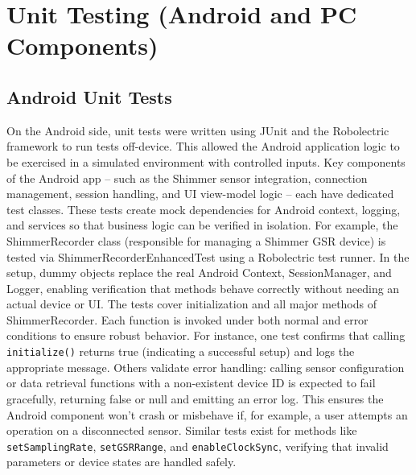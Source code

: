 \section{Unit Testing (Android and PC Components)}

\subsection{Android Unit Tests}

On the Android side, unit tests were written using JUnit and the Robolectric framework to run tests off-device. This allowed the Android application logic to be exercised in a simulated environment with controlled inputs. Key components of the Android app – such as the Shimmer sensor integration, connection management, session handling, and UI view-model logic – each have dedicated test classes. These tests create mock dependencies for Android context, logging, and services so that business logic can be verified in isolation. For example, the ShimmerRecorder class (responsible for managing a Shimmer GSR device) is tested via ShimmerRecorderEnhancedTest using a Robolectric test runner. In the setup, dummy objects replace the real Android Context, SessionManager, and Logger, enabling verification that methods behave correctly without needing an actual device or UI. The tests cover initialization and all major methods of ShimmerRecorder. Each function is invoked under both normal and error conditions to ensure robust behavior. For instance, one test confirms that calling \texttt{initialize()} returns true (indicating a successful setup) and logs the appropriate message. Others validate error handling: calling sensor configuration or data retrieval functions with a non-existent device ID is expected to fail gracefully, returning false or null and emitting an error log. This ensures the Android component won't crash or misbehave if, for example, a user attempts an operation on a disconnected sensor. Similar tests exist for methods like \texttt{setSamplingRate}, \texttt{setGSRRange}, and \texttt{enableClockSync}, verifying that invalid parameters or device states are handled safely.

